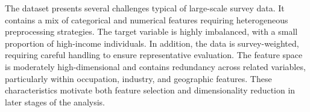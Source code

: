 The dataset presents several challenges typical of large-scale survey data. It contains a mix of categorical and numerical features requiring heterogeneous preprocessing strategies. The target variable is highly imbalanced, with a small proportion of high-income individuals. In addition, the data is survey-weighted, requiring careful handling to ensure representative evaluation. The feature space is moderately high-dimensional and contains redundancy across related variables, particularly within occupation, industry, and geographic features. These characteristics motivate both feature selection and dimensionality reduction in later stages of the analysis.

